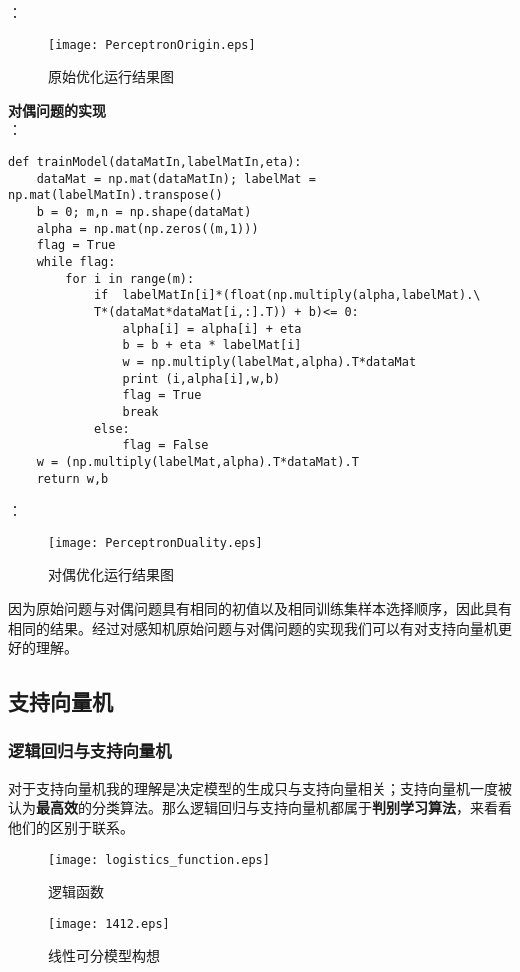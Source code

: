 ：
\begin{figure}[!htb]
  \centering
  \texttt{[image: PerceptronOrigin.eps]}
  \caption{原始优化运行结果图}
\end{figure}





\textbf{对偶问题的实现}\\
：
\begin{lstlisting}
def trainModel(dataMatIn,labelMatIn,eta):
    dataMat = np.mat(dataMatIn); labelMat = np.mat(labelMatIn).transpose()
    b = 0; m,n = np.shape(dataMat)
    alpha = np.mat(np.zeros((m,1)))
    flag = True
    while flag:
        for i in range(m):
            if  labelMatIn[i]*(float(np.multiply(alpha,labelMat).\
            T*(dataMat*dataMat[i,:].T)) + b)<= 0:
                alpha[i] = alpha[i] + eta
                b = b + eta * labelMat[i]
                w = np.multiply(labelMat,alpha).T*dataMat
                print (i,alpha[i],w,b)
                flag = True
                break
            else:
                flag = False
    w = (np.multiply(labelMat,alpha).T*dataMat).T
    return w,b
\end{lstlisting}


：
\begin{figure}[!htb]
  \centering
  \texttt{[image: PerceptronDuality.eps]}
  \caption{对偶优化运行结果图}
\end{figure}

因为原始问题与对偶问题具有相同的初值以及相同训练集样本选择顺序，因此具有相同的结果。经过对感知机原始问题与对偶问题的实现我们可以有对支持向量机更好的理解。

\newpage 


\subsection{支持向量机}
\subsubsection{逻辑回归与支持向量机}
对于支持向量机我的理解是决定模型的生成只与支持向量相关；支持向量机一度被认为\textbf{最高效}的分类算法。那么逻辑回归与支持向量机都属于\textbf{判别学习算法}，来看看他们的区别于联系。
\begin{figure}[!htb]
  \centering
  \texttt{[image: logistics\_function.eps]}
  \caption{逻辑函数}
\end{figure}
\begin{figure}[!htb]
  \centering
  \texttt{[image: 1412.eps]}
  \caption{线性可分模型构想}
\end{figure}

